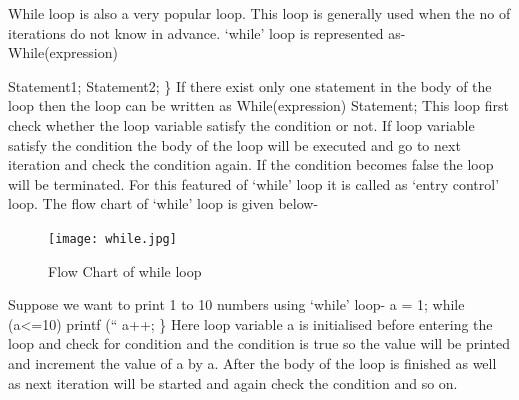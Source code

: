 \documentclass[conference]{IEEEtran}
\begin{document}
{ While loop is also a very popular loop. This loop is generally used when the no of iterations do not know in advance. 
‘while’ loop is represented as-
\linebreak
\linebreak
\hspace*{1cm}While(expression){
\linebreak
\hspace*{2cm}Statement1;
\linebreak
\hspace*{2cm}Statement2;
\linebreak
\hspace*{2cm}\}
\linebreak
\linebreak
If there exist only one statement in the body of the loop then the loop can be written as
\linebreak
\linebreak
\hspace*{1cm}While(expression)
\linebreak
\hspace*{2cm}Statement;
\linebreak
\linebreak
This loop first check whether the loop variable satisfy the condition or not. If loop variable satisfy the condition the body of the loop will be executed and go to next iteration and check the condition again. If the condition becomes false the loop will be terminated.
For this featured of ‘while’ loop it is called as ‘entry control’ loop.  
The flow chart of ‘while’ loop is given below-
\linebreak
\linebreak
\begin{figure}[h!]
\centering
\texttt{[image: while.jpg]}
\caption{Flow Chart of while loop}
\label{fig:method}
\end{figure}
Suppose we want to print 1 to 10 numbers using ‘while’ loop-
\linebreak
\linebreak
 a = 1;
\linebreak
while (a<=10){
\linebreak
\hspace*{1cm}printf (“%
\linebreak
\hspace*{1cm}a++;
\linebreak
\}
\linebreak
Here loop variable a is initialised before entering the loop and check for condition and the condition is true so the value will be printed and increment the value of a by a. After the body of the loop is finished as well as next iteration will be started and again check the condition and so on.
\linebreak
}}}
\end{document}
